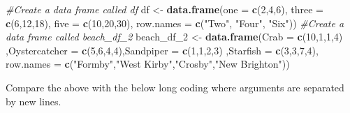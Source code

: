 \documentclass[]{book}
\newenvironment{Shaded}{\begin{snugshade}}{\end{snugshade}}
\newcommand{\KeywordTok}[1]{\textcolor[rgb]{0.13,0.29,0.53}{\textbf{#1}}}
\newcommand{\DataTypeTok}[1]{\textcolor[rgb]{0.13,0.29,0.53}{#1}}
\newcommand{\DecValTok}[1]{\textcolor[rgb]{0.00,0.00,0.81}{#1}}
\newcommand{\StringTok}[1]{\textcolor[rgb]{0.31,0.60,0.02}{#1}}
\newcommand{\CommentTok}[1]{\textcolor[rgb]{0.56,0.35,0.01}{\textit{#1}}}
\newcommand{\NormalTok}[1]{#1}
\begin{document}
\begin{Shaded}
\begin{Highlighting}[]
\CommentTok{#Create a data frame called df}
\NormalTok{df <-}\StringTok{ }\KeywordTok{data.frame}\NormalTok{(}\DataTypeTok{one =} \KeywordTok{c}\NormalTok{(}\DecValTok{2}\NormalTok{,}\DecValTok{4}\NormalTok{,}\DecValTok{6}\NormalTok{), }\DataTypeTok{three =} \KeywordTok{c}\NormalTok{(}\DecValTok{6}\NormalTok{,}\DecValTok{12}\NormalTok{,}\DecValTok{18}\NormalTok{), }\DataTypeTok{five =} \KeywordTok{c}\NormalTok{(}\DecValTok{10}\NormalTok{,}\DecValTok{20}\NormalTok{,}\DecValTok{30}\NormalTok{), }\DataTypeTok{row.names =} \KeywordTok{c}\NormalTok{(}\StringTok{"Two"}\NormalTok{, }\StringTok{"Four"}\NormalTok{, }\StringTok{"Six"}\NormalTok{))}
\CommentTok{#Create a data frame called beach_df_2}
\NormalTok{beach_df_}\DecValTok{2}\NormalTok{ <-}\StringTok{ }\KeywordTok{data.frame}\NormalTok{(}\DataTypeTok{Crab =} \KeywordTok{c}\NormalTok{(}\DecValTok{10}\NormalTok{,}\DecValTok{1}\NormalTok{,}\DecValTok{1}\NormalTok{,}\DecValTok{4}\NormalTok{) ,}\DataTypeTok{Oystercatcher =} \KeywordTok{c}\NormalTok{(}\DecValTok{5}\NormalTok{,}\DecValTok{6}\NormalTok{,}\DecValTok{4}\NormalTok{,}\DecValTok{4}\NormalTok{),}\DataTypeTok{Sandpiper =} \KeywordTok{c}\NormalTok{(}\DecValTok{1}\NormalTok{,}\DecValTok{1}\NormalTok{,}\DecValTok{2}\NormalTok{,}\DecValTok{3}\NormalTok{) ,}\DataTypeTok{Starfish =} \KeywordTok{c}\NormalTok{(}\DecValTok{3}\NormalTok{,}\DecValTok{3}\NormalTok{,}\DecValTok{7}\NormalTok{,}\DecValTok{4}\NormalTok{), }\DataTypeTok{row.names =} \KeywordTok{c}\NormalTok{(}\StringTok{"Formby"}\NormalTok{,}\StringTok{"West Kirby"}\NormalTok{,}\StringTok{"Crosby"}\NormalTok{,}\StringTok{"New Brighton"}\NormalTok{))}
\end{Highlighting}
\end{Shaded}

Compare the above with the below long coding where arguments are
separated by new lines.
\end{document}
